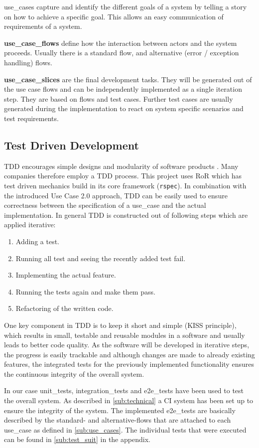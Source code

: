 \Glspl{use_case} capture and identify the different goals of a system by telling a story on how to achieve a specific goal. This allows an easy communication of requirements of a system. \cite{jacobson2011usecase}

\textbf{\Glspl{use_case_flow}} define how the interaction between actors and the system proceeds. Usually there is a standard flow, and alternative (error / exception handling) flows. 

\textbf{\Glspl{use_case_slice}} are the final development tasks. They will be generated out of the use case flows and can be independently implemented as a single iteration step. They are based on flows and test cases. Further test cases are usually generated during the implementation to react on system specific scenarios and test requirements.


\subsection{Test Driven Development}
\label{sec:tdd}
\Gls{TDD} encourages simple designs and modularity of software products \cite{tdd}. Many companies therefore employ a \gls{TDD} process. This project uses \gls{RoR} which has test driven mechanics build in its core framework (\texttt{rspec}). In combination with the introduced Use Case 2.0 approach, \gls{TDD} can be easily used to ensure correctness between the specification of a \gls{use_case} and the actual implementation. In general \gls{TDD} is constructed out of following steps which are applied iterative: 

\begin{enumerate}
	\item Adding a test.
	\item Running all test and seeing the recently added test fail.
	\item Implementing the actual feature.
	\item Running the tests again and make them pass.
	\item Refactoring of the written code.
\end{enumerate}


One key component in \gls{TDD} is to keep it short and simple (KISS principle), which results in small, testable and reusable modules in a software and usually leads to better code quality. As the software will be developed in iterative steps, the progress is easily trackable and although changes are made to already existing features, the integrated tests for the previously implemented functionality ensures the continuous integrity of the overall system.  

In our case \glspl{unit_test}, \glspl{integration_test} and \glspl{e2e_test} have been used to test the overall system. As described in \autoref{sub:technical} a \gls{CI} system has been set up to ensure the integrity of the system. The implemented \glspl{e2e_test} are basically described by the standard- and alternative-flows that are attached to each \gls{use_case} as defined in \autoref{sub:use_cases}. The individual tests that were executed can be found in \autoref{sub:test_suit} in the appendix.


